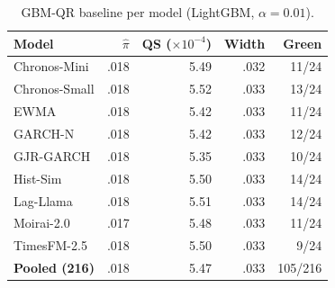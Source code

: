 
\begin{table}[htbp]
  \centering
  \caption{GBM-QR baseline per model (LightGBM, $\alpha = 0.01$).}
  \label{tab:gbm_qr}
  \footnotesize
  \begin{tabular}{@{}lrrrr@{}}
    \toprule
    Model & $\hat\pi$ & QS ($\times 10^{-4}$) & Width & Green \\
    \midrule
    Chronos-Mini     & .018 & 5.49 & .032 & 11/24 \\
    Chronos-Small    & .018 & 5.52 & .033 & 13/24 \\
    EWMA             & .018 & 5.42 & .033 & 11/24 \\
    GARCH-N          & .018 & 5.42 & .033 & 12/24 \\
    GJR-GARCH        & .018 & 5.35 & .033 & 10/24 \\
    Hist-Sim         & .018 & 5.50 & .033 & 14/24 \\
    Lag-Llama        & .018 & 5.51 & .033 & 14/24 \\
    Moirai-2.0       & .017 & 5.48 & .033 & 11/24 \\
    TimesFM-2.5      & .018 & 5.50 & .033 & 9/24 \\
    \midrule
    \textbf{Pooled (216)} & .018 & 5.47 & .033 & 105/216 \\
    \bottomrule
  \end{tabular}
\end{table}
